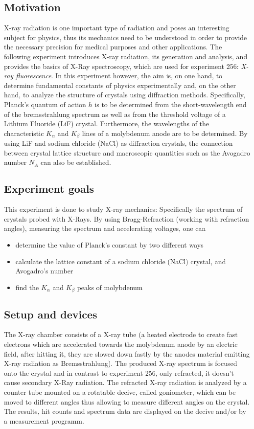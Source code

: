 \subsection{Motivation}
X-ray radiation is one important type of radiation and poses an interesting subject for physics, thus its mechanics need to be understood in order to provide the necessary precision for medical purposes and other applications. The following experiment introduces X-ray radiation, its generation and analysis, and provides the basics of X-Ray spectroscopy, which are used for experiment 256:\emph{ X-ray fluorescence}\autocite{Skript_2.2}. In this experiment however, the aim is, on one hand, to determine fundamental constants of physics experimentally and, on the other hand, to analyze the structure of crystals using diffraction methods. Specifically, Planck's quantum of action \(h\) is to be determined from the short-wavelength end of the bremsstrahlung spectrum as well as from the threshold voltage of a Lithium Fluoride (LiF) crystal. Furthermore, the wavelengths of the characteristic \(K_\alpha\) and \(K_\beta\) lines of a molybdenum anode are to be determined. By using LiF and sodium chloride (NaCl) as diffraction crystals, the connection between crystal lattice structure and macroscopic quantities such as the Avogadro number \(N_A\) can also be established.

\subsection{Experiment goals}
This experiment is done to study X-ray mechanics: Specifically the spectrum of crystals probed with X-Rays. By using Bragg-Refraction (working with refraction angles), measuring the spectrum and accelerating voltages, one can
\begin{itemize}
    \item determine the value of Planck's constant by two different ways
    \item calculate the lattice constant of a sodium chloride (NaCl) crystal, and Avogadro's number
    \item find the \(K_\alpha\) and \(K_\beta\) peaks of molybdenum
\end{itemize}

\subsection{Setup and devices}
The X-ray chamber consists of a X-ray tube (a heated electrode to create fast electrons which are accelerated towards the molybdenum anode by an electric field, after hitting it, they are slowed down fastly by the anodes material emitting X-ray radiation as Bremsstrahlung). The produced X-ray spectrum is focused onto the crystal and in contrast to experiment 256, only refracted, it doesn't cause secondary X-Ray radiation. The refracted X-ray radiation is analyzed by a counter tube mounted on a rotatable decive, called goniometer, which can be moved to different angles thus allowing to measure different angles on the crystal. The results, hit counts and spectrum data are displayed on the decive and/or by a measurement programm.

